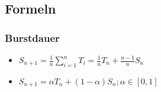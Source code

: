 \subsection{Formeln}
\subsubsection{Burstdauer}
\begin{itemize}
    \item $S_{n+1} = \frac{1}{n} \sum_{i=1}^n T_i = \frac{1}{n} T_n + \frac{n-1}{n} S_n$
    \item $S_{n+1} = \alpha T_n + (1-\alpha) S_n; \alpha \in [0,1]$
\end{itemize}